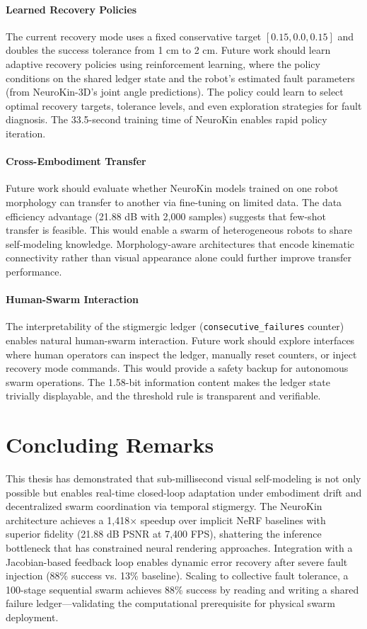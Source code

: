 \documentclass[12pt,a4paper,oneside]{report}
\begin{document}
\paragraph{Learned Recovery Policies}
The current recovery mode uses a fixed conservative target $[0.15, 0.0, 0.15]$ and doubles the success tolerance from 1 cm to 2 cm. Future work should learn adaptive recovery policies using reinforcement learning, where the policy conditions on the shared ledger state and the robot's estimated fault parameters (from NeuroKin-3D's joint angle predictions). The policy could learn to select optimal recovery targets, tolerance levels, and even exploration strategies for fault diagnosis. The 33.5-second training time of NeuroKin enables rapid policy iteration.

\paragraph{Cross-Embodiment Transfer}
Future work should evaluate whether NeuroKin models trained on one robot morphology can transfer to another via fine-tuning on limited data. The data efficiency advantage (21.88 dB with 2,000 samples) suggests that few-shot transfer is feasible. This would enable a swarm of heterogeneous robots to share self-modeling knowledge. Morphology-aware architectures \cite{patel2024getzero} that encode kinematic connectivity rather than visual appearance alone could further improve transfer performance.

\paragraph{Human-Swarm Interaction}
The interpretability of the stigmergic ledger (\texttt{consecutive\_failures} counter) enables natural human-swarm interaction. Future work should explore interfaces where human operators can inspect the ledger, manually reset counters, or inject recovery mode commands. This would provide a safety backup for autonomous swarm operations. The 1.58-bit information content makes the ledger state trivially displayable, and the threshold rule is transparent and verifiable.

\section{Concluding Remarks}

This thesis has demonstrated that sub-millisecond visual self-modeling is not only possible but enables real-time closed-loop adaptation under embodiment drift and decentralized swarm coordination via temporal stigmergy. The NeuroKin architecture achieves a 1,418× speedup over implicit NeRF baselines with superior fidelity (21.88 dB PSNR at 7,400 FPS), shattering the inference bottleneck that has constrained neural rendering approaches. Integration with a Jacobian-based feedback loop enables dynamic error recovery after severe fault injection (88\% success vs. 13\% baseline). Scaling to collective fault tolerance, a 100-stage sequential swarm achieves 88\% success by reading and writing a shared failure ledger—validating the computational prerequisite for physical swarm deployment.
\end{document}

